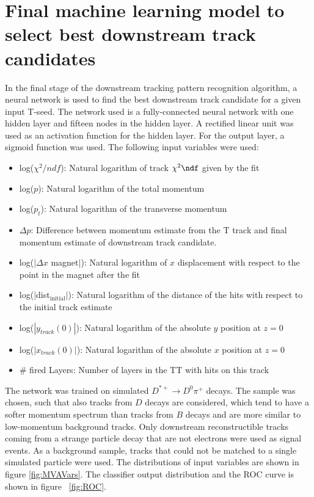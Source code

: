 \section{Final machine learning model to select best downstream track candidates}

In the final stage of the downstream tracking pattern recognition algorithm, a neural network is used to find the best downstream track
candidate for a given input T-seed.
 The network used is a fully-connected neural network with one hidden layer and fifteen nodes in the hidden layer. 
A rectified linear unit was used as an activation function for the hidden layer. For the output layer, a sigmoid function was used. The following input variables were used:

\begin{itemize}
\item log($\chi^{2}/ndf$): Natural logarithm of track $\chi^{2}\ndf$
given by the fit
\item log($p$): Natural logarithm of the total momentum
\item log($p_t$): Natural logarithm of the transverse momentum
\item $\Delta p$: Difference between momentum estimate from the T track and final momentum estimate of downstream track candidate.
\item log($|\Delta x$ magnet$|$): Natural logarithm of $x$ displacement with respect to
the point in the magnet after the fit
\item log($|$dist$_{\text{initial}}|$): Natural logarithm of the distance of the hits with respect 
to the initial track estimate
\item log($|y_{track}(0)|$): Natural logarithm of the absolute $y$ position at
$z=0$
\item log($|x_{track}(0)|$): Natural logarithm of the absolute $x$ position at
$z=0$
\item \# fired Layers: Number of layers in the TT with hits on this track
\end{itemize}

The network was trained on simulated $D^{*+} \rightarrow D^{0}\pi^{+}$ decays. The sample was chosen, such that also tracks from $D$ decays are considered, which tend to have a softer momentum spectrum than tracks from $B$ 
decays and are more similar to low-momentum background tracks. Only downstream reconstructible tracks
coming from a strange particle decay that are not electrons were used as
signal events. As a background sample, 
tracks that could not be matched to a single
simulated particle were used. The distributions of input variables are shown in figure \ref{fig:MVAVars}. The classifier output distribution and the ROC curve is shown in figure ~\ref{fig:ROC}. 


